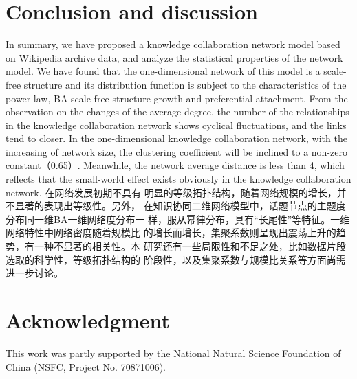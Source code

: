\documentclass{elsarticle}
\begin{document}
\section{Conclusion and discussion }
\label{sec:5concl-disc-}

In summary, we have proposed a knowledge collaboration network model
based on Wikipedia archive data, and analyze the statistical
properties of the network model. We have found that the
one-dimensional network of this model is a scale-free structure and
its distribution function is subject to the characteristics of the
power law, BA scale-free structure growth and preferential
attachment. From the observation on the changes of the average degree,
the number of the relationships in the knowledge collaboration network
shows cyclical fluctuations, and the links tend to closer. In the
one-dimensional knowledge collaboration network, with the increasing
of network size, the clustering coefficient will be inclined to a
non-zero constant（0.65）. Meanwhile, the network average distance is
less than 4, which reflects that the small-world effect exists
obviously in the knowledge collaboration network. 在网络发展初期不具有
明显的等级拓扑结构，随着网络规模的增长，并不显著的表现出等级性。另外，
在知识协同二维网络模型中，话题节点的主题度分布同一维BA一维网络度分布一
样，服从幂律分布，具有“长尾性”等特征。一维网络特性中网络密度随着规模比
的增长而增长，集聚系数则呈现出震荡上升的趋势，有一种不显著的相关性。本
研究还有一些局限性和不足之处，比如数据片段选取的科学性，等级拓扑结构的
阶段性，以及集聚系数与规模比关系等方面尚需进一步讨论。

\section*{Acknowledgment}
\label{sec:acknowledgment}
This work was partly supported by the National Natural Science Foundation of China (NSFC, Project No. 70871006).




\end{document}
